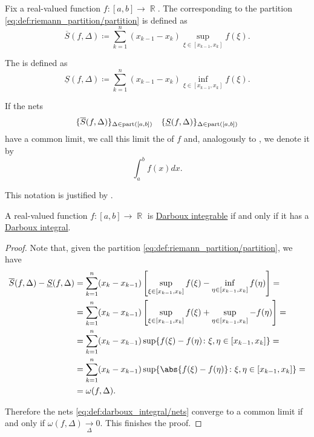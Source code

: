 \begin{definition}\label{def:darboux_integral}
  Fix a real-valued function \( f: [a, b] \to \BbbR \). The  corresponding to the partition \eqref{eq:def:riemann_partition/partition} is defined as
  \begin{equation*}
    \overline{S}(f, \Delta) \coloneqq \sum_{k=1}^n (x_{k-1} - x_k) \sup_{\xi \in [x_{k-1}, x_k]} f(\xi).
  \end{equation*}

  The  is defined as
  \begin{equation*}
    \underline{S}(f, \Delta) \coloneqq \sum_{k=1}^n (x_{k-1} - x_k) \inf_{\xi \in [x_{k-1}, x_k]} f(\xi).
  \end{equation*}

  If the nets
  \begin{align}\label{eq:def:darboux_integral/nets}
    \{ \overline{S}(f, \Delta) \}_{\Delta \in \operatorname{part}([a, b])}
    &&
    \{ \underline{S}(f, \Delta) \}_{\Delta \in \operatorname{part}([a, b])}
  \end{align}
  have a common limit, we call this limit the  of \( f \) and, analogously to , we denote it by
  \begin{equation*}
    \int_a^b f(x) dx.
  \end{equation*}

  This notation is justified by .
\end{definition}

\begin{proposition}\label{thm:darboux_integrable_iff_has_darboux_integral}
  A real-valued function \( f: [a, b] \to \BbbR \) is \hyperref[def:darboux_integrability]{Darboux integrable} if and only if it has a \hyperref[def:darboux_integral]{Darboux integral}.
\end{proposition}
\begin{proof}
  Note that, given the partition \eqref{eq:def:riemann_partition/partition}, we have
  \begin{align*}
    \overline{S}(f, \Delta) - \underline{S}(f, \Delta)
    &=
    \sum_{k=1}^n (x_k - x_{k-1}) \left[ \sup_{\xi \in [x_{k-1}, x_k]} f(\xi) - \inf_{\eta \in [x_{k-1}, x_k]} f(\eta) \right]
    = \\ &=
    \sum_{k=1}^n (x_k - x_{k-1}) \left[ \sup_{\xi \in [x_{k-1}, x_k]} f(\xi) + \sup_{\eta \in [x_{k-1}, x_k]} -f(\eta) \right]
    = \\ &=
    \sum_{k=1}^n (x_k - x_{k-1}) \sup \{ f(\xi) - f(\eta) \colon \xi, \eta \in [x_{k-1}, x_k] \}
    = \\ &=
    \sum_{k=1}^n (x_k - x_{k-1}) \sup \{ \abs{f(\xi) - f(\eta)} \colon \xi, \eta \in [x_{k-1}, x_k] \}
    = \\ &=
    \omega(f, \Delta).
  \end{align*}

  Therefore the nets \eqref{eq:def:darboux_integral/nets} converge to a common limit if and only if \( \omega(f, \Delta) \xrightarrow[\Delta]{} 0 \). This finishes the proof.
\end{proof}

